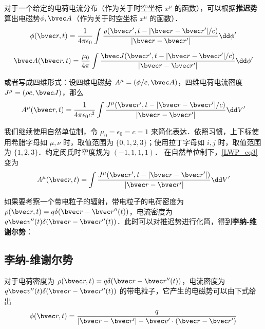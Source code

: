 

对于一个给定的电荷电流分布（作为关于时空坐标 $x^\mu$ 的函数），可以根据\textbf{推迟势}算出电磁势$\phi,\bvec A$（作为关于时空坐标 $x^\mu$ 的函数）．
\begin{equation}
\phi(\bvec r,t)=\frac{1}{4\pi\epsilon_0}\int \frac{\rho(\bvec r',t-|\bvec r-\bvec r'|/c)}{|\bvec r-\bvec r'|}\dd \phi'
\end{equation}

\begin{equation}
\bvec A(\bvec r,t)=\frac{\mu_0}{4\pi}\int \frac{\bvec J(\bvec r',t-|\bvec r-\bvec r'|/c)}{|\bvec r-\bvec r'|}\dd \phi'
\end{equation}

或者写成四维形式：设四维电磁势 $A^\mu=(\phi/c,\bvec A)$，四维电荷电流密度 $J^\mu=(\rho c,\bvec J)$，那么
\begin{equation}\label{LWP_eq3}
A^\mu(\bvec r,t)=\frac{1}{4\pi\epsilon_0c^2}\int \frac{J^\mu(\bvec r',t-|\bvec r-\bvec r'|/c)}{|\bvec r-\bvec r'|}\dd V'
\end{equation}

我们继续使用自然单位制，令 $\mu_0=\epsilon_0=c=1$ 来简化表达．依照习惯，上下标使用希腊字母如 $\mu, \nu$ 时，取值范围为 $\{0, 1, 2, 3\}$；使用拉丁字母如 $i, j$ 时，取值范围为 $\{1, 2, 3\}$．约定闵氏时空度规为 $(-1,1,1,1)$．
在自然单位制下，\autoref{LWP_eq3} 变为
\begin{equation}\label{LWP_eq4}
A^\mu(\bvec r,t)=\int \frac{J^\mu(\bvec r',t-|\bvec r-\bvec r'|)}{|\bvec r-\bvec r'|}\dd V'
\end{equation}

如果要考察一个带电粒子的辐射，带电粒子的电荷密度为 $\rho(\bvec r,t)=q\delta(\bvec r-\bvec r''(t))$，电流密度为 $q\bvec v''(t) \delta(\bvec r-\bvec r''(t))$．此时可以对推迟势进行化简，得到\textbf{李纳-维谢尔势}：
\subsection{李纳-维谢尔势}

对于电荷密度为 $\rho(\bvec r,t)=q\delta(\bvec r-\bvec r''(t))$，电流密度为 $q\bvec v''(t) \delta(\bvec r-\bvec r''(t))$ 的带电粒子，它产生的电磁势可以由下式给出
\begin{equation}\label{LWP_eq1}
\phi(\bvec r,t)=\frac{q}{|\bvec r-\bvec r'|-\bvec v'\cdot (\bvec r-\bvec r')}
\end{equation}

